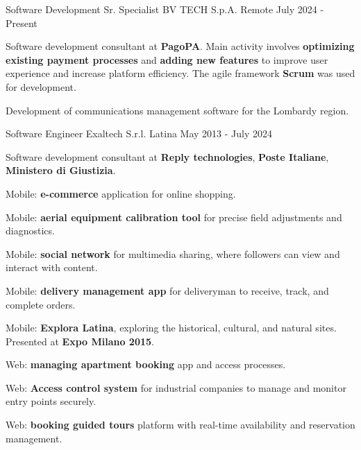 

\begin{cventries}

  \cventry
    {Software Development Sr. Specialist} %
    {BV TECH S.p.A.} %
    {Remote} %
    {July 2024 - Present} %
    {
      \begin{cvitems} %
        \item {Software development consultant at \textbf{PagoPA}. Main activity involves \textbf{optimizing existing payment processes} and \textbf{adding new features} to improve user experience and increase platform efficiency. The agile framework \textbf{Scrum} was used for development.}
        \item {Development of communications management software for the Lombardy region.}  
      \end{cvitems}
    }

  \cventry
    {Software Engineer} %
    {Exaltech S.r.l.} %
    {Latina} %
    {May 2013 - July 2024} %
    {
      \begin{cvitems} %
        \item {Software development consultant at \textbf{Reply technologies}, \textbf{Poste Italiane}, \textbf{Ministero di Giustizia}.}
        \item {Mobile: \textbf{e-commerce} application for online shopping.}
        \item {Mobile: \textbf{aerial equipment calibration tool} for precise field adjustments and diagnostics.}
        \item {Mobile: \textbf{social network} for multimedia sharing, where followers can view and interact with content.}
        \item {Mobile: \textbf{delivery management app} for deliveryman to receive, track, and complete orders.}
        \item {Mobile: \textbf{Explora Latina}, exploring the historical, cultural, and natural sites. Presented at \textbf{Expo Milano 2015}.}
        \item {Web: \textbf{managing apartment booking} app and access processes.}
        \item {Web: \textbf{Access control system} for industrial companies to manage and monitor entry points securely.}
        \item {Web: \textbf{booking guided tours} platform with real-time availability and reservation management.}
      \end{cvitems}
    }

\end{cventries}
